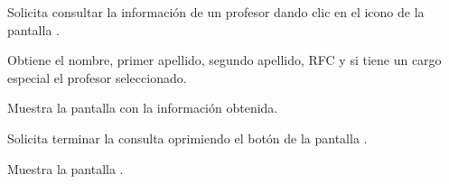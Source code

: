 \begin{UCtrayectoria}
	\UCpaso [\UCactor] Solicita consultar la información de un profesor dando clic en el icono %
	de la pantalla .
	
	\UCpaso [\UCsist] Obtiene el nombre, primer apellido, segundo apellido, RFC y si tiene un cargo especial el profesor seleccionado.
	
	\UCpaso [\UCsist] Muestra la pantalla  con la información obtenida.
	
	\UCpaso [\UCactor] Solicita terminar la consulta oprimiendo el botón  de la pantalla .
	
	\UCpaso [\UCsist] Muestra la pantalla .
	
\end{UCtrayectoria}
